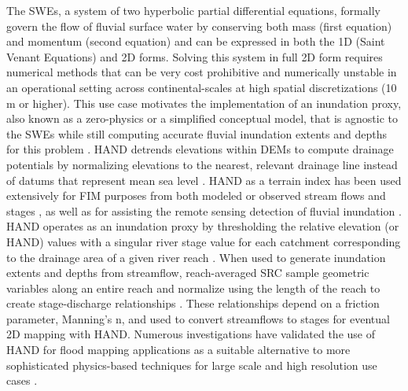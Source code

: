 \documentclass[preprint,review,12pt]{dependencies/elsarticle}
\begin{document}
The \acp{SWE}, a system of two hyperbolic partial differential equations, formally govern the flow of fluvial surface water by conserving both mass (first equation) and momentum (second equation) and can be expressed in both the \ac{1D} (Saint Venant Equations) and \ac{2D} forms.
Solving this system in full \ac{2D} form requires numerical methods that can be very cost prohibitive and numerically unstable in an operational setting across continental-scales at high spatial discretizations (10 \ac{m} or higher).
This use case motivates the implementation of an inundation proxy, also known as a zero-physics or a simplified conceptual model, that is agnostic to the \acp{SWE} while still computing accurate fluvial inundation extents and depths for this problem \citep{teng2015rapid}.
\ac{HAND} detrends elevations within \acp{DEM} to compute drainage potentials by normalizing elevations to the nearest, relevant drainage line instead of datums that represent mean sea level \citep{renno2008hand,nobre2011height,nobre2016hand}.
\ac{HAND} as a terrain index has been used extensively for \ac{FIM} purposes from both modeled or observed stream flows and stages \citep{nobre2016hand,afshari2018comparison,garousi2019terrain,johnson2019integrated,zheng2018geoflood,zheng2018river,zhang2018comparative,teng2015rapid,li2022accounting,li2020evaluation}, as well as for assisting the remote sensing detection of fluvial inundation \citep{aristizabal2020high,shastry2019using,aristizabal2021mapping,huang2017comparison,twele2016sentinel}.
\ac{HAND} operates as an inundation proxy by thresholding the relative elevation (or \ac{HAND}) values with a singular river stage value for each catchment corresponding to the drainage area of a given river reach \citep{nobre2016hand,garousi2019terrain,johnson2019integrated,zheng2018geoflood,teng2015rapid,li2020evaluation,liu2016cybergis,maidment2017conceptual,liu2018cybergis,liu2020height,liu2018review}.
When used to generate inundation extents and depths from streamflow, reach-averaged \ac{SRC} sample geometric variables along an entire reach and normalize using the length of the reach to create stage-discharge relationships \citep{zheng2018river,aristizabal2022reducing,godbout2019error}.
These relationships depend on a friction parameter, Manning's n, and used to convert streamflows to stages for eventual \ac{2D} mapping with \ac{HAND}.
Numerous investigations have validated the use of \ac{HAND} for flood mapping applications as a suitable alternative to more sophisticated physics-based techniques for large scale and high resolution use cases \citep{johnson2019integrated,li2020evaluation,li2022comparative,aristizabal2022reducing,nobre2016hand,godbout2019error,afshari2018comparison,zhang2018comparative,teng2015rapid,teng2017flood,diehl2021improving}.
\end{document}
